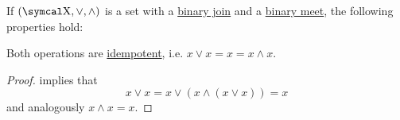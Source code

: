 \begin{proposition}\label{thm:binary_lattice_operations_properties}
  If \( (\CX, \vee, \wedge) \) is a set with a \hyperref[def:binary_lattice_operations/join]{binary join} and a \hyperref[def:binary_lattice_operations/meet]{binary meet}, the following properties hold:
  \begin{DefEnum}
     Both operations are \hyperref[def:algebraic_theory/idempotent_element]{idempotent}, i.e. \( x \vee x = x = x \wedge x \).
  \end{DefEnum}
\end{proposition}
\begin{proof}
    implies that
  \begin{equation*}
    x \vee x = x \vee (x \wedge (x \vee x)) = x
  \end{equation*}
  and analogously \( x \wedge x = x \).
\end{proof}

